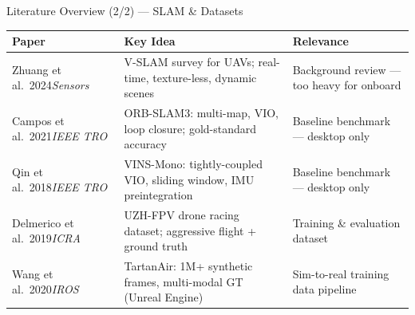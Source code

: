 \documentclass[aspectratio=169, 10pt]{beamer}
\begin{document}
\begin{frame}{Literature Overview (2/2) --- SLAM \& Datasets}
\begin{table}
\centering\scriptsize
\begin{tabular}{@{}p{2.8cm}p{4.5cm}p{4.5cm}@{}}
\toprule
\textbf{Paper} & \textbf{Key Idea} & \textbf{Relevance} \\
\midrule
Zhuang et al.\ 2024\newline \emph{Sensors} & V-SLAM survey for UAVs; real-time, texture-less, dynamic scenes & Background review --- too heavy for onboard \\
\addlinespace
Campos et al.\ 2021\newline \emph{IEEE TRO} & ORB-SLAM3: multi-map, VIO, loop closure; gold-standard accuracy & Baseline benchmark --- desktop only \\
\addlinespace
Qin et al.\ 2018\newline \emph{IEEE TRO} & VINS-Mono: tightly-coupled VIO, sliding window, IMU preintegration & Baseline benchmark --- desktop only \\
\addlinespace
Delmerico et al.\ 2019\newline \emph{ICRA} & UZH-FPV drone racing dataset; aggressive flight + ground truth & Training \& evaluation dataset \\
\addlinespace
Wang et al.\ 2020\newline \emph{IROS} & TartanAir: 1M+ synthetic frames, multi-modal GT (Unreal Engine) & Sim-to-real training data pipeline \\
\bottomrule
\end{tabular}
\end{table}
\end{frame}
\end{document}
